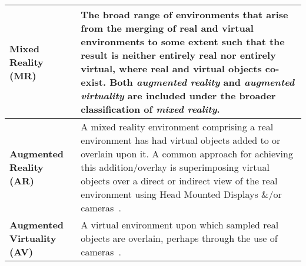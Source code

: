 \begin{center}
\begin{longtable}{| l | p{12cm} |}
\hline
		

\textbf{Mixed Reality (MR)} & The broad range of environments that arise from the merging of real and virtual environments to some extent such that the result is neither entirely real nor entirely virtual, where real and virtual objects co-exist. Both \textit{augmented reality} and \textit{augmented virtuality} are included under the broader classification of \textit{mixed reality}. \\

\hline
		

\textbf{Augmented Reality (AR)} & A mixed reality environment comprising a real environment has had virtual objects added to or overlain upon it. A common approach for achieving this addition/overlay is superimposing virtual objects over a direct or indirect view of the real environment using Head Mounted Displays \&/or cameras~\cite{Krevelen2010}. \\



\hline


\textbf{Augmented Virtuality (AV)} & A virtual environment upon which sampled real objects are overlain, perhaps through the use of cameras~\cite{caballero:behand}. \\


\hline



\end{longtable}
\end{center}
